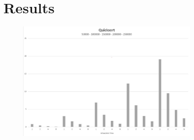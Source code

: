 \chapter{Results}

\begin{figure}[H]
    \centering
    \includegraphics[width=0.8\textwidth]{graphics/Quicksort.jpg}
    \label{fig:Quicksort}
\end{figure}
